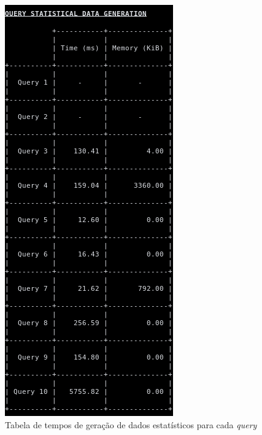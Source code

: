 \documentclass[11pt, a4paper]{article}
\begin{document}
\begin{figure}[H]
    \centering
    \includegraphics[scale=0.6]{res-fase2/testing_screenshots/statistics.png}
    \caption{Tabela de tempos de geração de dados estatísticos para cada \emph{query}}
    \label{fig:query-screenshot}
\end{figure}
\end{document}
